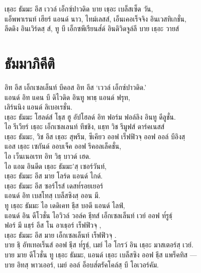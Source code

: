 \begin{thaitrans}
เธฺอะ ธัมมะ อีส เววล์ เอ็กซ์ปาวดิด บาย เธฺอะ เบล็สเซ็ด  วัน,\\
แอ็พพาเรนท์ เฮียร์ แอนด์ นาว, ไทม์เลสส์, เอ็นเคอเร็จจิง อินเวสทิเกชั่น,\\
ลีดดิง อินเวิร์ดสฺ ส์, ทู บี เอ็กซพีเรียนส๎ด์ อินดิวิดจูล์ลี บาย เธฺอะ วายส์\\
\end{thaitrans}

\chapter{ธัมมาภิคีติ}

\begin{leader}
\end{leader}

\begin{thaitrans}
อิท อีส เอ็กเซลเล็นท์ บีคอส อิท อีส ‘เววล์ เอ็กซ์ปาวดิด.’\\
แอนด์ อิท แคน บี ดิไวดิด อินทู พาธฺ แอนด์ ฟรุท,\\
\vin เลิร์นนิง แอนด์ ลิเบอเรชั่น.\\
เธฺอะ ธัมมะ โฮลด์ส์ โธฺส ฮู อัปโฮลด์ อิท ฟอร์ม ฟอล์ลิง อินทู ดีลูชั่น.\\
ไอ รีเวียร์ เธฺอะ เอ็กเซลเลนท์ ทีชชิง, แธฺท วิช รีมูฟส์ ดาร์คเนสส์\\
เธฺอะ ธัมมะ, วิช อีส เธฺอะ สุพรีม, ซีเคียว  ออฟ เร็ฟฟิวจฺ  ออฟ ออล์ บีอิงสฺ\\
แอส เธฺอะ เซกันด์ ออบเจ็ค ออฟ รีคอลเล็คชั่น,\\
\vin ไอ เว็นเนอเรท อิท วิธฺ บาวด์ เฮด.\\
ไอ แอม อินดีด เธฺอะ ธัมมะ’สฺ  เซอร์วันท์,\\
\vin เธฺอะ ธัมมะ อีส มาย โลร์ด แอนด์ ไกด์.\\
เธฺอะ ธัมมะ อีส ซอร์โรส์ เดสท๎รอยเยอร์\\
\vin แอนด์ อิท เบสโทสฺ  เบล็สซิงสฺ  ออน มี.\\
ทู เธฺอะ ธัมมะ ไอ เดดิเคท ธฺีส บอดี แอนด์ ไลฟ์,\\
แอนด์ อิน ดีโวชั่น ไอวิวล์ วอล์ค ธฺีทส์  เอ็กเซลเล็นท์ เวย์ ออฟ ท๎รูธฺ์\\
ฟอร์ มี แธฺร์ อีส โน อาเธฺอร์ เร็ฟฟิวจฺ ,\\
\vin เธฺอะ ธัมมะ อีส มาย เอ็กเซลเล็นท์ เร็ฟฟิวจฺ .\\
บาย ธฺิ  อัทเทอเร็นส์ ออฟ ธฺีส ท๎รูธฺ์, เมย์ ไอ โกรว์ อิน เธฺอะ มาสเตอร์สฺ  เวย์.\\
บาย มาย ดีโวชั่น ทู เธฺอะ ธัมมะ, แอนด์ เธฺอะ เบล็สซิง ออฟ ธฺีส แพร็คทิส —\\
บาย อิทสฺ  พาวเออร์, เมย์ ออล์ อ็อบส๎ตรัคโคล์สฺ บี โอเวอร์คัม.\\
\end{thaitrans}

